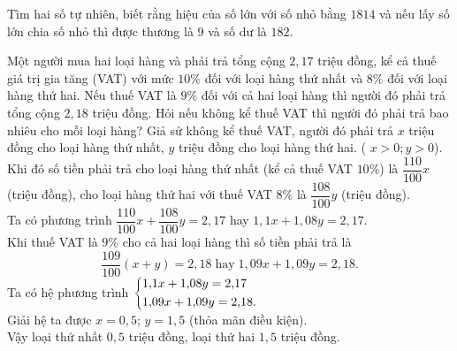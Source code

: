 \begin{vd}
	Tìm hai số tự nhiên, biết rằng hiệu của số lớn với số nhỏ bằng $1814$ và nếu lấy số lớn chia số nhỏ thì được thương là $9$ và số dư là $182$.

\end{vd}


\begin{vd}
Một người mua hai loại hàng và phải trả tổng cộng $ 2{,}17 $ triệu đồng, kể cả thuế giá trị gia tăng (VAT) với mức $ 10\% $ đối với loại hàng thứ nhất và $ 8\% $ đối với loại hàng thứ hai. Nếu thuế VAT là $ 9\% $ đối với cả hai loại hàng thì người đó phải trả tổng cộng $ 2{,}18 $ triệu đồng. Hỏi nếu không kể thuế VAT thì người đó phải trả bao nhiêu cho mỗi loại hàng?
	\loigiai
	{
	Giả sử không kể thuế VAT, người đó phải trả $ x $ triệu đồng cho loại hàng thứ nhất, $ y $ triệu đồng cho loại hàng thứ hai. ( $ x > 0; y > 0 $).\\
	Khi đó số tiền phải trả cho loại hàng thứ nhất (kể cả thuế VAT $ 10\% $) là $ \dfrac{110}{100}x $ (triệu đồng), cho loại hàng thứ hai với thuế VAT $ 8\% $ là $ \dfrac{108}{100}y $ (triệu đồng).\\
	Ta có phương trình $ \dfrac{110}{100}x+\dfrac{108}{100}y=2{,}17 $ hay $ 1{,}1x+1{,}08y=2{,}17 $.\\
	Khi thuế VAT là $ 9\% $ cho cả hai loại hàng thì số tiền phải trả là 
	\[ \dfrac{109}{100}(x+y)=2{,}18  \;\text{hay}\;  1{,}09x+1{,}09y=2{,}18. \]
	Ta có hệ phương trình $ \left\{\begin{aligned}&1{,}1x+1{,}08y=2{,}17\\&1{,}09x+1{,}09y=2{,}18.\end{aligned}\right.$\\
	Giải hệ ta được $ x=0{,}5$; $y=1{,}5 $ (thỏa mãn điều kiện).\\
	Vậy loại thứ nhất $ 0{,}5 $ triệu đồng, loại thứ hai $ 1{,}5 $ triệu đồng.
	}
\end{vd}




